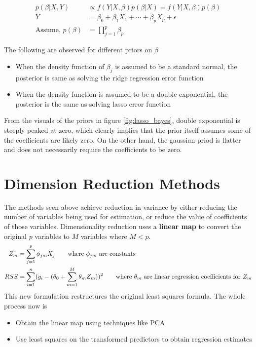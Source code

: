\documentclass[../statistical_learning_notes.tex]{subfiles}
\begin{document}
    \begin{align*}
        p(\beta|X,Y) &\propto f(Y|X,\beta)p(\beta|X) = f(Y|X,\beta)p(\beta) \tag*{assuming X is constant}\\
        Y &= \beta_{0} + \beta_{1}X_{1} + \cdots + \beta_{p}X_{p} + \epsilon\\
        \text{Assume, } p(\beta) &= \prod_{j=1}^{p} \beta_{p} \tag*{for some density function $g$}  
    \end{align*}

    The following are observed for different priors on $\beta$

    \begin{itemize}
        \item When the density function of $\beta_{j}$ is assumed to be a standard normal, the posterior is same as solving the ridge regression error function
        \item When the density function is assumed to be a double exponential, the posterior is the same as solving lasso error function
    \end{itemize}

    From the visuals of the priors in figure \ref{fig:lasso_bayes}, double exponential is steeply peaked at zero, which clearly implies that the prior itself assumes some of the coefficients are likely zero. On the other hand, the gaussian priod is flatter and does not necessarily require the coefficients to be zero.


    \section{Dimension Reduction Methods}
    The methods seen above achieve reduction in variance by either reducing the number of variables being used for estimation, or reduce the value of coefficients of those variables.\newline
    Dimensionality reduction uses a \textbf{linear map} to convert the original $p$ variables to $M$ variables where $M < p$.
    \begin{align*}
        Z_{m} &= \sum_{j=1}^{p} \phi_{jm}X_{j} \tag*{where $\phi_{jm}$ are constants} \\
        RSS &= \sum_{i=1}^{n} (y_{i} - (\theta_{0}+\sum_{m=1}^{M}\theta_{m}Z_{m}))^{2} \tag*{where $\theta_{m}$ are linear regression coefficients for $Z_{m}$}
    \end{align*}
    This new formulation restructures the original least squares formula. The whole process now is
    \begin{itemize}
        \item Obtain the linear map using techniques like PCA
        \item Use least squares on the transformed predictors to obtain regression estimates
    \end{itemize}
\end{document}
